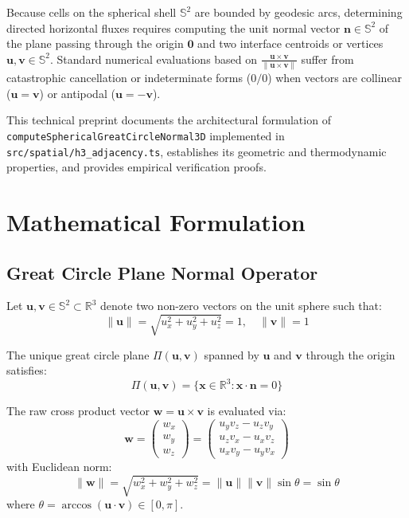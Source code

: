 \documentclass[10pt,journal,compsoc]{IEEEtran}
\begin{document}
Because cells on the spherical shell $\mathbb{S}^2$ are bounded by geodesic arcs, determining directed horizontal fluxes requires computing the unit normal vector $\mathbf{n} \in \mathbb{S}^2$ of the plane passing through the origin $\mathbf{0}$ and two interface centroids or vertices $\mathbf{u}, \mathbf{v} \in \mathbb{S}^2$. Standard numerical evaluations based on $\frac{\mathbf{u} \times \mathbf{v}}{\|\mathbf{u} \times \mathbf{v}\|}$ suffer from catastrophic cancellation or indeterminate forms ($0/0$) when vectors are collinear ($\mathbf{u} = \mathbf{v}$) or antipodal ($\mathbf{u} = -\mathbf{v}$).

This technical preprint documents the architectural formulation of \texttt{computeSphericalGreatCircleNormal3D} implemented in \texttt{src/spatial/h3\_adjacency.ts}, establishes its geometric and thermodynamic properties, and provides empirical verification proofs.

\section{Mathematical Formulation}

\subsection{Great Circle Plane Normal Operator}
Let $\mathbf{u}, \mathbf{v} \in \mathbb{S}^2 \subset \mathbb{R}^3$ denote two non-zero vectors on the unit sphere such that:
\begin{equation}
\|\mathbf{u}\| = \sqrt{u_x^2 + u_y^2 + u_z^2} = 1, \quad \|\mathbf{v}\| = 1
\end{equation}

The unique great circle plane $\Pi(\mathbf{u}, \mathbf{v})$ spanned by $\mathbf{u}$ and $\mathbf{v}$ through the origin satisfies:
\begin{equation}
\Pi(\mathbf{u}, \mathbf{v}) = \{ \mathbf{x} \in \mathbb{R}^3 : \mathbf{x} \cdot \mathbf{n} = 0 \}
\end{equation}

The raw cross product vector $\mathbf{w} = \mathbf{u} \times \mathbf{v}$ is evaluated via:
\begin{equation}
\mathbf{w} = \begin{pmatrix} w_x \\ w_y \\ w_z \end{pmatrix} = \begin{pmatrix} u_y v_z - u_z v_y \\ u_z v_x - u_x v_z \\ u_x v_y - u_y v_x \end{pmatrix}
\end{equation}
with Euclidean norm:
\begin{equation}
\|\mathbf{w}\| = \sqrt{w_x^2 + w_y^2 + w_z^2} = \|\mathbf{u}\| \|\mathbf{v}\| \sin \theta = \sin \theta
\end{equation}
where $\theta = \arccos(\mathbf{u} \cdot \mathbf{v}) \in [0, \pi]$.
\end{document}
